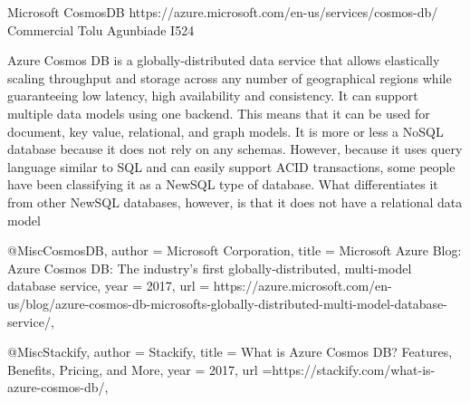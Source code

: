 Microsoft CosmosDB 
https://azure.microsoft.com/en-us/services/cosmos-db/
Commercial 
Tolu Agunbiade 
I524


Azure Cosmos DB is a globally-distributed data service that allows elastically
scaling throughput and storage across any number of geographical regions while
guaranteeing low latency, high availability and consistency\cite{CosmosDB}. It
can support multiple data models using one backend. This means that it can be
used for document, key value, relational, and graph models. It is more or less a
NoSQL database because it does not rely on any schemas. However, because it uses
query language similar to SQL and can easily support ACID transactions, some
people have been classifying it as a NewSQL type of database. What
differentiates it from other NewSQL databases, however, is that it does not have
a relational data model\cite{Stackify}


@Misc{CosmosDB, 
author = {Microsoft Corporation}, 
title = {Microsoft Azure Blog: Azure Cosmos DB: The industry’s first globally-distributed, multi-model database service}, 
year = {2017}, 
url = {https://azure.microsoft.com/en-us/blog/azure-cosmos-db-microsofts-globally-distributed-multi-model-database-service/},
}


@Misc{Stackify, 
author = {Stackify}, 
title = {What is Azure Cosmos DB? Features, Benefits, Pricing, and More}, 
year = {2017}, 
url ={https://stackify.com/what-is-azure-cosmos-db/}, 
}
